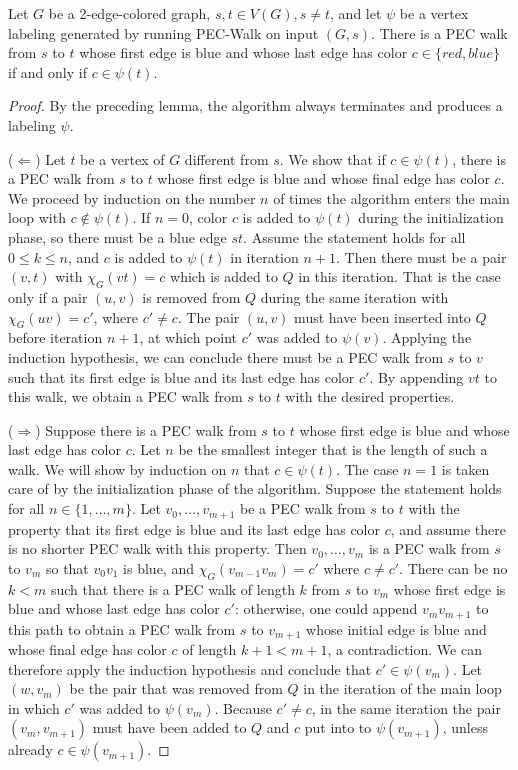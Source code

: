 \documentclass{llncs}
\def\hy{\hbox{-}\nobreak\hskip0pt} \newcommand{\ellipsis}{$\dots$}
\begin{document}
\begin{lemma} \label{lem:algorithm} Let $G$ be a 2\hy edge\hy colored graph,
  $s,t \in V(G), s \neq t$, and let $\psi$ be a vertex labeling generated by
  running {PEC-Walk} on input $(G,s)$. There is a PEC walk
  from $s$ to $t$ whose first edge is blue and whose last edge has color $c
  \in \{\mathit{red},\mathit{blue}\}$ if and only if $c \in \psi(t)$.
\end{lemma}
\begin{proof} 
  By the preceding lemma, the algorithm always terminates and produces a
  labeling $\psi$.

  ($\Leftarrow$) Let $t$ be a vertex of $G$ different from $s$. We show that
  if $c \in \psi(t)$, there is a PEC walk from $s$ to $t$ whose first edge is
  blue and whose final edge has color $c$. We proceed by induction on the
  number $n$ of times the algorithm enters the main loop with $c \notin
  \psi(t)$. If $n = 0$, color $c$ is added to $\psi(t)$ during the
  initialization phase, so there must be a blue edge $st$. Assume the
  statement holds for all $0 \leq k \leq n$, and $c$ is added to $\psi(t)$ in
  iteration $n+1$. Then there must be a pair $(v,t)$ with $\chi_G(vt) = c$
  which is added to $Q$ in this iteration. That is the case only if a pair
  $(u,v)$ is removed from $Q$ during the same iteration with $\chi_G(uv) =
  c'$, where $c' \neq c$. The pair $(u,v)$ must have been inserted into $Q$
  before iteration $n+1$, at which point $c'$ was added to $\psi(v)$. Applying
  the induction hypothesis, we can conclude there must be a PEC walk from $s$
  to $v$ such that its first edge is blue and its last edge has color $c'$. By
  appending $vt$ to this walk, we obtain a PEC walk from $s$ to $t$ with the
  desired properties.

  ($\Rightarrow$) Suppose there is a PEC walk from $s$ to $t$ whose first edge
  is blue and whose last edge has color $c$. Let $n$ be the smallest integer
  that is the length of such a walk. We will show by induction on $n$ that $c
  \in \psi(t)$. The case $n = 1$ is taken care of by the initialization phase
  of the algorithm. Suppose the statement holds for all $n \in \{1, \dots,
  m\}$. Let $v_0,\dots, v_{m+1}$ be a PEC walk from $s$ to $t$ with the
  property that its first edge is blue and its last edge has color $c$, and
  assume there is no shorter PEC walk with this property. Then
  $v_0,\dots,v_{m}$ is a PEC walk from $s$ to $v_{m}$ so that $v_0v_1$ is
  blue, and $\chi_G(v_{m-1}v_m) = c'$ where $c \neq c'$. There can be no $k <
  m$ such that there is a PEC walk of length $k$ from $s$ to $v_{m}$ whose
  first edge is blue and whose last edge has color $c'$: otherwise, one could
  append $v_{m}v_{m+1}$ to this path to obtain a PEC walk from $s$ to
  $v_{m+1}$ whose initial edge is blue and whose final edge has color $c$ of
  length $k + 1 < m + 1$, a contradiction. We can therefore apply the
  induction hypothesis and conclude that $c' \in \psi(v_{m})$. Let $(w,v_{m})$
  be the pair that was removed from $Q$ in the iteration of the main loop in
  which $c'$ was added to $\psi(v_{m})$. Because $c' \neq c$, in the same
  iteration the pair $(v_{m},v_{m+1})$ must have been added to $Q$ and $c$ put
  into to $\psi(v_{m+1})$, unless already $c \in \psi(v_{m+1})$.
\end{proof}
\end{document}
